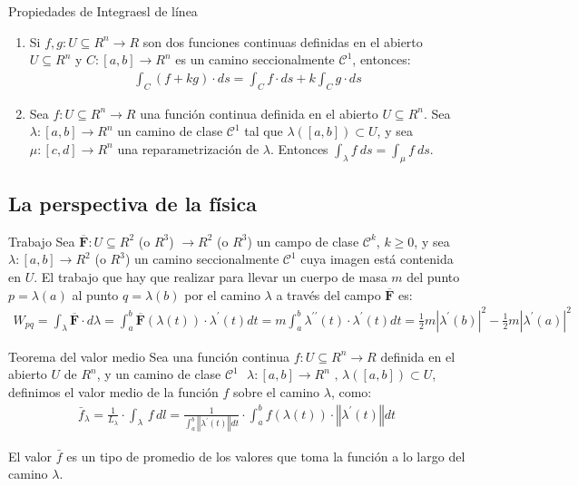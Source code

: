 \documentclass[a4paper, twoside]{article}
\numberwithin{equation}{section}
\numberwithin{figure}{section}
\numberwithin{table}{section}
\newcommand{\vect}[1]{\overline{\textbf{#1}}}
\begin{document}
\begin{corolario*}{Propiedades de Integraesl de línea}
	\begin{enumerate}
		\item Si $f,g: U \subseteq R^n \to R$ son dos funciones continuas definidas en el abierto $U \subseteq R^n$ y $C:[a,b] \to R^n$ es un camino seccionalmente $\mathcal{C}^1$, entonces:
			\begin{align}
				\int_{C} (f+kg) \cdot ds=\int_{C}f \cdot ds+k\int_{C}g \cdot ds
			\end{align}
		\item Sea $f: U \subseteq R^n \to R$ una función continua definida en el abierto $U \subseteq R^n$. Sea $\lambda:[a,b] \to R^n$ un camino de clase $\mathcal{C}^1$ tal que $\lambda \left([a,b]\right) \subset U$, y sea $\mu:[c,d] \to R^n$ una reparametrización de $\lambda$. Entonces $\int_{\lambda}f\: ds=\int_{\mu}f\: ds$.
	\end{enumerate}
\end{corolario*}

\subsection{La perspectiva de la física}
\begin{corolario*}{Trabajo}
	Sea $\vect{F}: U \subseteq R^2$ (o $R^3$) $ \to R^2$ (o $R^3$) un campo de clase $\mathcal{C}^{k}$, $k\ge0$, y sea $\lambda:[a,b] \to R^2$ (o $R^3$) un camino seccionalmente $\mathcal{C}^1$ cuya imagen está contenida en $U$. El trabajo que hay que realizar para llevar un cuerpo de masa $m$ del punto $p=\lambda(a)$ al punto $q=\lambda(b)$ por el camino $\lambda$ a través del campo $\vect{F}$ es:\\
	\begin{align}
		W_{pq}=\int_{\lambda} \vect{F} \cdot d\lambda=\int_{a}^{b} \vect{F} \left(\lambda(t)\right) \cdot \lambda^\prime(t)dt=m\int_{a}^{b}\lambda^{\prime\prime}(t) \cdot \lambda^\prime (t)dt=\frac{1}{2}m\left|\lambda^\prime(b)\right|^2-\frac{1}{2}m\left|\lambda^\prime(a)\right|^2
	\end{align}
\end{corolario*}

\begin{corolario*}{Teorema del valor medio}
	Sea una función continua $f: U \subseteq R^n \rightarrow R$ definida en el abierto $U$ de $R^n$, y un camino de clase $\mathcal{C}^1 \text{ } \lambda:[a,b] \rightarrow R^n \text{ , } \lambda([a,b])\subset U$, definimos el valor medio de la función $f$ sobre el camino $\lambda$, como:
	\begin{align}
		\bar{f}_{\lambda}=\frac{1}{L_{\lambda}} \cdot \int_{\lambda}\, f\, dl=\frac{1}{\int_{a}^{b}\left\Vert \lambda^\prime(t)\right\Vert dt} \cdot \int_{a}^{b}f(\lambda(t)) \cdot \left\Vert \lambda^\prime(t)\right\Vert dt
	\end{align}
	
	El valor $\bar{f}$ es un tipo de promedio de los valores que toma la función a lo largo del camino $\lambda$.
\end{corolario*}
\end{document}
